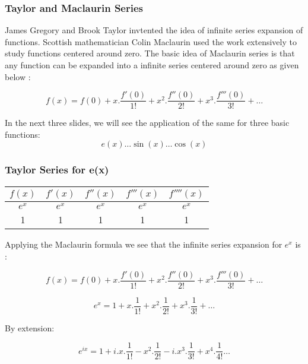 \documentclass[10pt]{beamer}
\begin{document}
\begin{frame}
	\frametitle{Taylor and Maclaurin Series}
	James Gregory and Brook Taylor invtented the idea of infinite series expansion of functions.  Scottish mathematician Colin Maclaurin used the work extensively to study functions centered around zero.  The basic idea of Maclaurin series is that any function can be expanded into a infinite series centered around zero as given below :
	\vspace{20pt}

	\large $$f(x) = f(0)+x.\dfrac{f'(0)}{1!}+ x^2.\dfrac{f''(0)}{2!} +x^3.\dfrac{f'''(0)}{3!} + \dots$$

	\vspace{20pt}

	In the next three slides, we will see the application of the same for three basic functions: $$e(x) \dots \sin(x) \dots \cos(x)$$
\end{frame}

\begin{frame}
	\frametitle{Taylor Series for e(x)}
	\begin{center}
		\begin{tabular}{|c|c|c|c|c|}
			\hline
			$f(x)$ & $f'(x)$ & $f''(x)$ & $f'''(x)$ & $f''''(x)$ \\
			\hline
			$e^x$  & $e^x$   & $e^x$    & $e^x$     & $e^x$      \\
			\hline
			1      & 1       & 1        & 1         & 1          \\
			\hline
		\end{tabular}
	\end{center}
	\vspace{20pt}
	Applying the Maclaurin formula we see that the infinite series expansion for $e^x$ is :

	\large $$f(x) = f(0)+x.\dfrac{f'(0)}{1!}+ x^2.\dfrac{f''(0)}{2!} +x^3.\dfrac{f'''(0)}{3!} + \dots$$

	\large $$e^x = 1+x.\dfrac{1}{1!}+ x^2.\dfrac{1}{2!} +x^3.\dfrac{1}{3!} + \dots$$

	By extension:

	\large $$e^{ix} = 1+i.x.\dfrac{1}{1!}- x^2.\dfrac{1}{2!} -i.x^3.\dfrac{1}{3!} + x^4.\dfrac{1}{4!} \dots$$


\end{frame}
\end{document}
